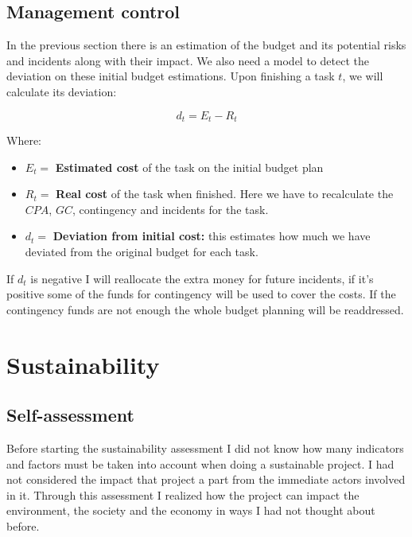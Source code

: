 \pagebreak
\subsection{Management control}

In the previous section there is an estimation of the budget and its potential risks and
incidents along with their impact. We also need a model to detect the
deviation on these initial budget estimations. Upon finishing a task $t$, we will
calculate its deviation:

\begin{equation}
    d_t = E_t - R_t
\end{equation}

Where:

\begin{itemize}
    \item $E_t = $ \textbf{Estimated cost} of the task on the initial budget
        plan
    \item $R_t = $ \textbf{Real cost} of the task when finished. Here we have to
        recalculate the $CPA$, $GC$, contingency and incidents for the task.
    \item $d_t = $ \textbf{Deviation from initial cost:} this estimates how much
        we have deviated from the original budget for each task.
\end{itemize}

If $d_t$ is negative I will reallocate the extra money for future incidents, if
it's positive some of the funds for contingency will be used to cover the costs.
If the contingency funds are not enough the whole budget planning will be
readdressed.

\pagebreak
\section{Sustainability}%
\label{sec:sustainability}

\subsection{Self-assessment}

Before starting the sustainability assessment I did not know how many indicators
and factors must be taken into account when doing a sustainable project. I had
not considered the impact that project a part from the immediate actors involved
in it. Through this assessment I realized how the project can impact the
environment, the society and the economy in ways I had not thought about before.

